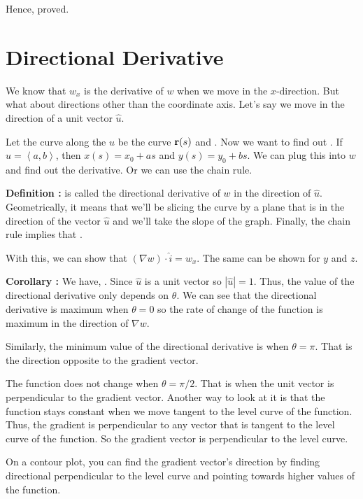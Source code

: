 Hence, proved.


\section{Directional Derivative}

We know that $w_x$ is the derivative of $w$ when we move in the $x$-direction. 
But what about directions other than the coordinate axis.
Let's say we move in the direction of a unit vector $\hat{u}$.

Let the curve along the $\hat{u}$ be the curve ${\bf r}(s)$ and  .
Now we want to find out . 
If $\hat{u} = \left< a, b \right>$, then $x(s) = x_0 + as$ and $y(s) = y_0 + bs$.
We can plug this into $w$ and find out the derivative. Or we can use the chain rule.

{\bf Definition : }  is called the directional derivative of $w$ in the direction of $\hat{u}$.
Geometrically, it means that we'll be slicing the curve by a plane that is in the direction of the vector $\hat{u}$ and we'll take the slope of the graph.
Finally, the chain rule implies that .

With this, we can show that $ (\nabla w) \cdot \hat{i} = w_x $. The same can be shown for $y$ and $z$.

{\bf Corollary : } We have,  . 
Since $\hat{u}$ is a unit vector so $|\hat{u}| = 1$. Thus, the value of the directional derivative only depends on $\theta$.
We can see that the directional derivative is maximum when $\theta = 0$ so the rate of change of the function is maximum in the direction of $\nabla w$.

Similarly, the minimum value of the directional derivative is when $\theta = \pi$. 
That is the direction opposite to the gradient vector.

The function does not change when $\theta = \pi/2$. That is when the unit vector is perpendicular to the gradient vector.
Another way to look at it is that the function stays constant when we move tangent to the level curve of the function. 
Thus, the gradient is perpendicular to any vector that is tangent to the level curve of the function. 
So the gradient vector is perpendicular to the level curve.

On a contour plot, you can find the gradient vector's direction by finding directional perpendicular to the level curve and pointing towards higher values of the function.



